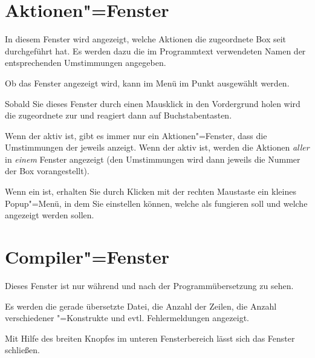 \section{Aktionen"=Fenster}\label{sec:DE_ACTION}
In diesem Fenster wird angezeigt, welche Aktionen die zugeordnete 
Box seit  durchgeführt 
hat. Es werden dazu die im Programmtext verwendeten Namen der 
entsprechenden Umstimmungen angegeben.


Ob das Fenster angezeigt wird, kann im Menü  
im Punkt  ausgewählt werden.


Sobald Sie dieses Fenster durch einen Mausklick in den Vordergrund
holen wird die zugeordnete  zur
 und reagiert dann auf
Buchstabentasten.


Wenn der  aktiv ist, gibt es
immer nur ein Aktionen"=Fenster, dass die Umstimmungen der jeweils
 anzeigt. Wenn der
 aktiv ist,
werden die Aktionen \emph{aller}
 in \emph{einem} Fenster
angezeigt (den Umstimmungen wird dann jeweils die Nummer der Box
vorangestellt).


Wenn ein 
 ist, erhalten Sie durch Klicken
mit der rechten Maustaste ein kleines Popup"=Menü, in dem Sie
einstellen können, welche  als
 fungieren soll und welche
 angezeigt werden sollen.



\section{Compiler"=Fenster}\label{sec:DE_COMP}
Dieses Fenster ist nur während und nach der Programmübersetzung 
zu sehen.

Es werden die gerade übersetzte Datei, die Anzahl der Zeilen, 
die Anzahl verschiedener \mutabor{}"=Konstrukte und evtl. Fehlermeldungen 
angezeigt.

Mit Hilfe des breiten Knopfes im unteren Fensterbereich lässt 
sich das Fenster schließen.

